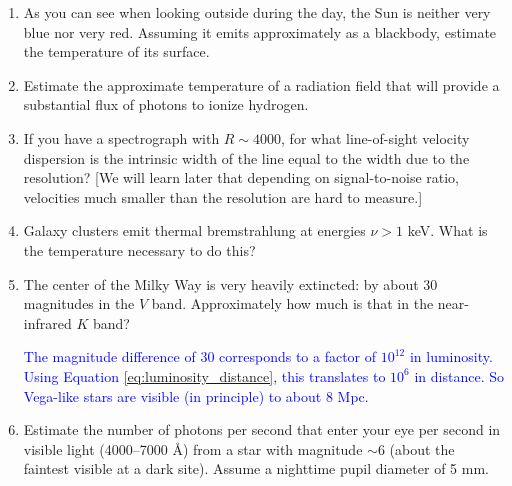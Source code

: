 \begin{enumerate} 
\item As you can see when looking outside during the day, the Sun is
    neither very blue nor very red. Assuming it emits approximately as
    a blackbody, estimate the temperature of its surface.

\item Estimate the approximate temperature of a radiation field that
    will provide a substantial flux of photons to ionize hydrogen.

\item If you have a spectrograph with $R\sim 4000$, for what
line-of-sight velocity dispersion is the intrinsic width of the line
equal to the width due to the resolution? [We will learn later that
depending on signal-to-noise ratio, velocities much smaller than the
resolution are hard to measure.]

\item Galaxy clusters emit thermal bremstrahlung at energies $\nu > 1$
keV. What is the temperature necessary to do this? 

\item The center of the Milky Way is very heavily extincted: by about
    30 magnitudes in the $V$ band. Approximately how much is that in
    the near-infrared $K$ band?

  \ifanswers \textcolor{blue}{ The magnitude difference of 30
    corresponds to a factor of $10^{12}$ in luminosity. Using Equation
    \ref{eq:luminosity_distance}, this translates to $10^6$ in
    distance. So Vega-like stars are visible (in principle) to about 8
    Mpc.  }
  \fi

\item Estimate the number of photons per second that enter your eye
    per second in visible light (4000--7000 \AA) from a star with
  magnitude $\sim 6$ (about the faintest visible at a dark
  site). Assume a nighttime pupil diameter of 5 mm.


\end{enumerate}
